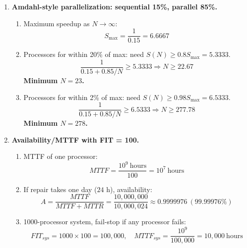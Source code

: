 \documentclass[11pt]{article}
\begin{document}
\begin{enumerate}
\begin{enumerate}[label=(\alph*)]
\item \textbf{Same clock, same instruction counts, equal runs of P1 and P2: which machine is faster?}\\
For P2: $CPI_{M1}=0.5(2)+0.2(1)+0.3(3)=2.1$, $CPI_{M2}=2.0$.\\
Average CPI over equal runs:
\[
\overline{CPI}_{M1}=\frac{1.6+2.1}{2}=1.85,\quad \overline{CPI}_{M2}=2.0
\]
So M1 is faster by $2.0/1.85\approx \boxed{1.081\times}$ ($\approx 8.1\%$).

\item \textbf{Find workload using only P1/P2 that gives equal performance at same clock.}\\
Let fraction of P1 be $x$. Then
\[
CPI_{M1}=1.6x+2.1(1-x)=2.1-0.5x,\quad CPI_{M2}=2.0
\]
Set equal: $2.1-0.5x=2.0\Rightarrow x=0.2$.\\
\textbf{Workload: $\boxed{20\%\,P1,\ 80\%\,P2}$ (ratio $1:4$).}
\end{enumerate}

\item \textbf{Amdahl-style parallelization: sequential 15\%, parallel 85\%.}
\begin{enumerate}[label=(\alph*)]
\item Maximum speedup as $N\to\infty$:
\[
S_{\max}=\frac{1}{0.15}=\boxed{6.6667}
\]
\item Processors for within 20\% of max: need $S(N)\ge 0.8S_{\max}=5.3333$.
\[
\frac{1}{0.15+0.85/N}\ge 5.3333 \Rightarrow N\ge 22.67
\]
\textbf{Minimum $N=\boxed{23}$.}
\item Processors for within 2\% of max: need $S(N)\ge 0.98S_{\max}=6.5333$.
\[
\frac{1}{0.15+0.85/N}\ge 6.5333 \Rightarrow N\ge 277.78
\]
\textbf{Minimum $N=\boxed{278}$.}
\end{enumerate}

\item \textbf{Availability/MTTF with FIT = 100.}
\begin{enumerate}[label=(\alph*)]
\item MTTF of one processor:
\[
MTTF=\frac{10^9\ \text{hours}}{100}=\boxed{10^7\ \text{hours}}
\]
\item If repair takes one day ($24$ h), availability:
\[
A=\frac{MTTF}{MTTF+MTTR}=\frac{10{,}000{,}000}{10{,}000{,}024}\approx \boxed{0.9999976}\ (99.99976\%)
\]
\item 1000-processor system, fail-stop if any processor fails:
\[
FIT_{sys}=1000\times 100=100{,}000,\quad MTTF_{sys}=\frac{10^9}{100{,}000}=\boxed{10{,}000\ \text{hours}}
\]
\end{enumerate}
\end{enumerate}
\end{document}
